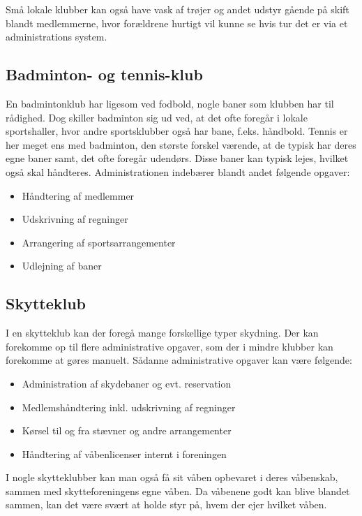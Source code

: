 Små lokale klubber kan også have vask af trøjer og andet udstyr gående på skift blandt medlemmerne, hvor forældrene
hurtigt vil kunne se hvis tur det er via et administrations system.

\subsection{Badminton- og tennis-klub}

En badmintonklub har ligesom ved fodbold, nogle baner som klubben har til rådighed. Dog skiller badminton sig ud ved, at
det ofte foregår i lokale sportshaller, hvor andre sportsklubber også har bane, f.eks. håndbold. Tennis er her meget
ens med badminton, den største forskel værende, at de typisk har deres egne baner samt, det ofte foregår udendørs. Disse baner kan
typisk lejes, hvilket også skal håndteres. Administrationen indebærer blandt andet følgende opgaver:

\begin{itemize}
\item Håndtering af medlemmer
\item Udskrivning af regninger
\item Arrangering af sportsarrangementer
\item Udlejning af baner
\end{itemize}

\subsection{Skytteklub}

I en skytteklub kan der foregå mange forskellige typer skydning. Der kan forekomme
op til flere administrative opgaver, som der i mindre klubber kan forekomme at gøres manuelt. 
Sådanne administrative opgaver kan være følgende:

\begin{itemize}
\item Administration af skydebaner og evt. reservation
\item Medlemshåndtering inkl. udskrivning af regninger
\item Kørsel til og fra stævner og andre arrangementer
\item Håndtering af våbenlicenser internt i foreningen
\end{itemize}

I nogle skytteklubber kan man også få sit våben opbevaret i deres våbenskab, sammen med skytteforeningens egne våben. Da
våbenene godt kan blive blandet sammen, kan det være svært at holde styr på, hvem der ejer hvilket våben.


